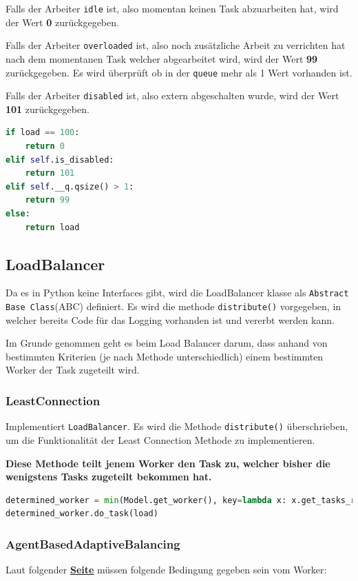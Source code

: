 Falls der Arbeiter \verb|idle| ist, also momentan keinen Task abzuarbeiten hat, wird der Wert \textbf{0} zurückgegeben.

Falls der Arbeiter \verb|overloaded| ist, also noch zusätzliche Arbeit zu verrichten hat nach dem momentanen Task welcher abgearbeitet wird, wird der Wert \textbf{99} zurückgegeben. Es wird überprüft ob in der \verb|queue| mehr als 1 Wert vorhanden ist.

Falls der Arbeiter \verb|disabled| ist, also extern abgeschalten wurde, wird der Wert \textbf{101} zurückgegeben.


\begin{lstlisting}[language=python]
if load == 100:
	return 0
elif self.is_disabled:
	return 101
elif self.__q.qsize() > 1:
	return 99
else:
	return load
\end{lstlisting}
\subsection{LoadBalancer}
Da es in Python keine Interfaces gibt, wird die LoadBalancer klasse als \verb|Abstract Base Class|(ABC) definiert. Es wird die methode \verb|distribute()| vorgegeben, in welcher bereits Code für das Logging vorhanden ist und vererbt werden kann.

Im Grunde genommen geht es beim Load Balancer darum, dass anhand von bestimmten Kriterien (je nach Methode unterschiedlich) einem bestimmten Worker der Task zugeteilt wird. 

\subsubsection{LeastConnection}
Implementiert \verb|LoadBalancer|. Es wird die Methode \verb|distribute()| überschrieben, um die Funktionalität der Least Connection Methode zu implementieren.

\textbf{Diese Methode teilt jenem Worker den Task zu, welcher bisher die wenigstens Tasks zugeteilt bekommen hat.} 

\begin{lstlisting}[language=python]
determined_worker = min(Model.get_worker(), key=lambda x: x.get_tasks_received())
determined_worker.do_task(load)
\end{lstlisting}

\subsubsection{AgentBasedAdaptiveBalancing}
Laut folgender \underline{\textbf{\href{https://support.kemptechnologies.com/hc/en-us/articles/115005405746-API-for-Agent-Based-Adaptive-Balancing}{Seite}}} müssen folgende Bedingung gegeben sein vom Worker:

